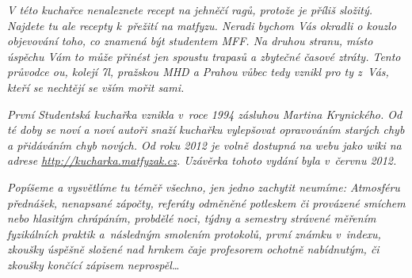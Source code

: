 \textit{V této kuchařce nenaleznete recept na jehněčí ragů, protože je příliš
složitý.  Najdete tu ale recepty k~přežití na matfyzu. Neradi bychom Vás
okradli o kouzlo objevování toho, co znamená být studentem MFF. Na druhou
stranu, místo ú\-spě\-chu Vám to může přinést jen spoustu trapasů a zbytečné
časové ztráty. Tento průvodce \MFF{}ou, kolejí \17l, pražskou MHD a Prahou
vůbec tedy vznikl pro ty z~Vás, kteří se nechtějí se vším mořit sami.}

\textit{První Studentská kuchařka vznikla v~roce 1994 zásluhou Martina
Krynického. Od té doby se noví a noví autoři snaží kuchařku
vylepšovat opravováním starých chyb a přidáváním chyb nových. Od roku 2012 je volně dostupná na webu jako wiki na adrese \url{http://kucharka.matfyzak.cz}.
Uzávěrka tohoto vydání byla v~červnu 2012.}

\textit{Popíšeme a vysvětlíme tu téměř všechno, jen jedno zachytit
neumíme: Atmosféru přednášek, nenapsané zápočty, referáty odměněné
potleskem či provázené smíchem nebo hlasitým chrápáním, probdělé
noci, týdny a semestry strávené mě\-ře\-ním fyzikálních praktik
a~následným smolením protokolů, první známku v~indexu, zkou\-šky
úspěšně složené nad hrnkem čaje profesorem ochotně nabídnutým, či
zkoušky končící zápisem neprospěl\dots}